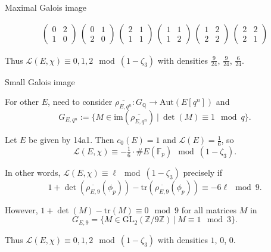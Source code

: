 \documentclass[10pt]{beamer}
\begin{document}
\begin{frame}[t]{Maximal Galois image}
\begin{example}
{$$\begin{array}{c}
\begin{pmatrix} 0 & 2 \\ 1 & 0 \end{pmatrix} \ \begin{pmatrix} 0 & 1 \\ 2 & 0 \end{pmatrix} \ \begin{pmatrix} 2 & 1 \\ 1 & 1 \end{pmatrix} \ \begin{pmatrix} 1 & 1 \\ 1 & 2 \end{pmatrix} \ \begin{pmatrix} 1 & 2 \\ 2 & 2 \end{pmatrix} \ \begin{pmatrix} 2 & 2 \\ 2 & 1 \end{pmatrix}
\end{array}
$$
} \vspace{-0.2cm}

\pause

Thus $ \mathcal{L}(E, \chi) \equiv 0, 1, 2 \mod (1 - \zeta_3) $ with densities $ \tfrac{9}{24} $, $ \tfrac{9}{24} $, $ \tfrac{6}{24} $.
\end{example}

\end{frame}

\begin{frame}[t]{Small Galois image}

For other $ E $, need to consider $ \overline{\rho_{E, q^n}} : G_\mathbb{Q} \to \mathrm{Aut}(E[q^n]) $ and
$$ G_{E, q^n} := \{M \in \mathrm{im}(\overline{\rho_{E, q^n}}) \ | \ \det(M) \equiv 1 \mod q\}. $$

\pause

\begin{example}
Let $ E $ be given by 14a1. Then $ c_0(E) = 1 $ and $ \mathcal{L}(E) = \tfrac{1}{6} $, so
$$ \mathcal{L}(E, \chi) \equiv -\tfrac{1}{6} \cdot \#E(\mathbb{F}_p) \mod (1 - \zeta_3). $$

\pause

In other words, $ \mathcal{L}(E, \chi) \equiv \ell \mod (1 - \zeta_3) $ precisely if
$$ 1 + \det(\overline{\rho_{E, 9}}(\phi_p)) - \mathrm{tr}(\overline{\rho_{E, 9}}(\phi_p)) \equiv -6\ell \mod 9. $$

\pause

However, $ 1 + \det(M) - \mathrm{tr}(M) \equiv 0 \mod 9 $ for all matrices $ M $ in
$$ G_{E, 9} = \{M \in \mathrm{GL}_2(\mathbb{Z} / 9\mathbb{Z}) \ | \ M \equiv 1 \mod 3\}. $$

\pause

Thus $ \mathcal{L}(E, \chi) \equiv 0, 1, 2 \mod (1 - \zeta_3) $ with densities $ 1 $, $ 0 $, $ 0 $.
\end{example}

\end{frame}
\end{document}
